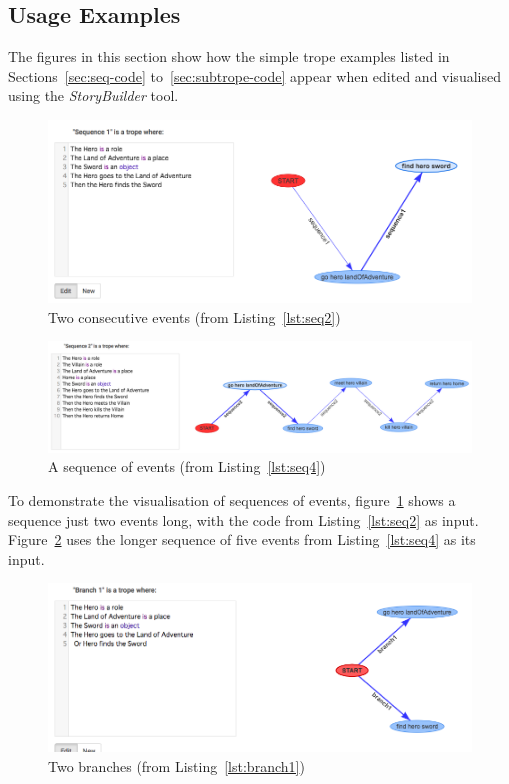 \documentclass[11pt]{report}
\begin{document}
\subsection{Usage Examples}

The figures in this section show how the simple trope examples listed in Sections~\ref{sec:seq-code}
to~\ref{sec:subtrope-code} appear when edited and visualised using the
\emph{StoryBuilder} tool.


\begin{figure}[!h]
\centerline{\includegraphics[width=\textwidth]{storybuilder-seq1.png}}
\caption{Two consecutive events (from Listing~\ref{lst:seq2})}\label{fig:sb-seq1}
\end{figure}

\begin{figure}[!h]
\centerline{\includegraphics[width=\textwidth]{storybuilder-seq2.png}}
\caption{A sequence of events (from Listing~\ref{lst:seq4})}\label{fig:sb-seq2}
\end{figure}

To demonstrate the visualisation of sequences of events,
figure~\ref{fig:sb-seq1} shows a sequence just two events long, with the code
from Listing~\ref{lst:seq2} as input. Figure~\ref{fig:sb-seq2} uses the longer
sequence of five events from Listing~\ref{lst:seq4} as its input.


\begin{figure}[!h]
\centerline{\includegraphics[width=\textwidth]{storybuilder-branch1.png}}
\caption{Two branches (from Listing~\ref{lst:branch1})}\label{fig:sb-branch1}
\end{figure}
\end{document}
